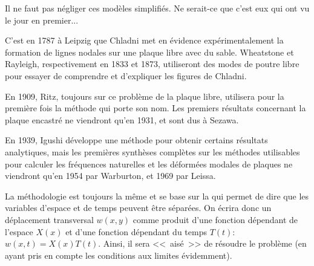 \begin{histoire}
Il ne faut pas négliger ces modèles simplifiés. Ne serait-ce que c'est eux qui ont vu le jour en premier...

\medskip
C'est en 1787 à Leipzig que Chladni 
met en évidence expérimentalement la formation de lignes nodales sur une plaque libre avec du sable.
Wheatstone 
et Rayleigh, 
respectivement en 1833 et 1873, utiliseront des modes de poutre libre pour essayer
de comprendre et d'expliquer les figures de Chladni.

En 1909, Ritz, toujours sur ce problème de la plaque libre, utilisera pour 
la première fois la méthode qui porte son nom.
Les premiers résultats concernant la plaque encastré ne viendront qu'en 1931, et sont dus à Sezawa.

En 1939, Igushi développe une méthode pour obtenir certains résultats analytiques, mais les premières
synthèses complètes sur les méthodes utilisables pour calculer les fréquences naturelles et les déformées
modales de plaques ne viendront qu'en 1954 par Warburton, et 1969 par 
Leissa.
\end{histoire}

\medskip
La méthodologie est toujours la même et se base sur la  qui
permet de dire que les variables d'espace et de temps peuvent être séparées.
On écrira donc un déplacement transversal $w(x,y)$ comme produit d'une fonction dépendant de l'espace $X(x)$ et
d'une fonction dépendant du temps $T(t)$: $w(x,t)=X(x)T(t)$.
Ainsi, il sera <<~aisé~>> de résoudre le problème (en ayant pris en compte les conditions aux limites évidemment).

